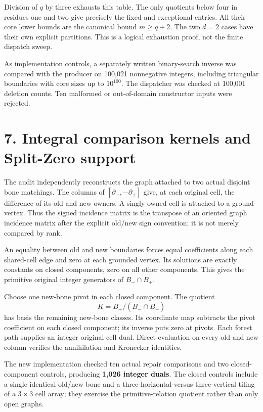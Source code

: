 \documentclass[
  11pt,
]{article}
\begin{document}
Division of \(q\) by three exhausts this table. The only quotients below
four in residues one and two give precisely the fixed and exceptional
entries. All their core lower bounds are the canonical bound
\(m\ge q+2\). The two \(d=2\) cases have their own explicit partitions.
This is a logical exhaustion proof, not the finite dispatch sweep.

As implementation controls, a separately written binary-search inverse
was compared with the producer on 100,021 nonnegative integers,
including triangular boundaries with core sizes up to \(10^{100}\). The
dispatcher was checked at 100,001 deletion counts. Ten malformed or
out-of-domain constructor inputs were rejected.

\section{7. Integral comparison kernels and Split-Zero
support}\label{integral-comparison-kernels-and-split-zero-support}

The audit independently reconstructs the graph attached to two actual
disjoint bone matchings. The columns of \([\partial_-,-\partial_+]\)
give, at each original cell, the difference of its old and new owners. A
singly owned cell is attached to a ground vertex. Thus the signed
incidence matrix is the transpose of an oriented graph incidence matrix
after the explicit old/new sign convention; it is not merely compared by
rank.

An equality between old and new boundaries forces equal coefficients
along each shared-cell edge and zero at each grounded vertex. Its
solutions are exactly constants on closed components, zero on all other
components. This gives the primitive original integer generators of
\(B_-\cap B_+\).

Choose one new-bone pivot in each closed component. The quotient \[
K=B_+/(B_-\cap B_+)
\] has basis the remaining new-bone classes. Its coordinate map
subtracts the pivot coefficient on each closed component; its inverse
puts zero at pivots. Each forest path supplies an integer original-cell
dual. Direct evaluation on every old and new column verifies the
annihilation and Kronecker identities.

The new implementation checked ten actual repair comparisons and two
closed-component controls, producing \textbf{1,026 integer duals}. The
closed controls include a single identical old/new bone and a
three-horizontal-versus-three-vertical tiling of a \(3\times3\) cell
array; they exercise the primitive-relation quotient rather than only
open graphs.
\end{document}
